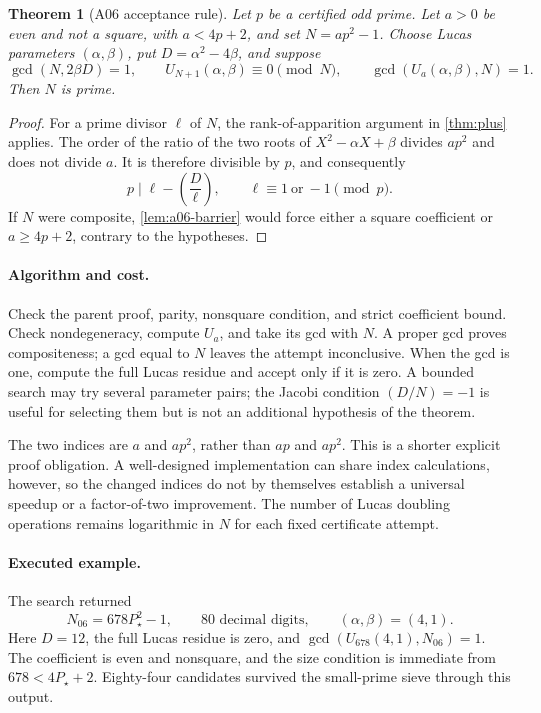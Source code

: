 \documentclass[11pt,a4paper]{article}
\newtheorem{theorem}{Theorem}[section]
\theoremstyle{definition}\newtheorem{definition}[theorem]{Definition}
\theoremstyle{remark}\newtheorem{remark}[theorem]{Remark}
\begin{document}
\begin{theorem}[A06 acceptance rule]\label{thm:a06}
Let $p$ be a certified odd prime. Let $a>0$ be even and not a square,
with $a<4p+2$, and set $N=ap^2-1$. Choose Lucas parameters
$(\alpha,\beta)$, put $D=\alpha^2-4\beta$, and suppose
\begin{equation}\label{eq:a06-tests}
 \gcd(N,2\beta D)=1,\qquad
 U_{N+1}(\alpha,\beta)\equiv0\pmod N,\qquad
 \gcd(U_a(\alpha,\beta),N)=1.
\end{equation}
Then $N$ is prime.
\end{theorem}
\begin{proof}
For a prime divisor $\ell$ of $N$, the rank-of-apparition argument in
\cref{thm:plus} applies. The order of the ratio of the two roots of
$X^2-\alpha X+\beta$ divides $ap^2$ and does not divide $a$.
It is therefore divisible by $p$, and consequently
\[
 p\mid\ell-\left(\frac D\ell\right),
 \qquad \ell\equiv1\ \text{or}\ -1\pmod p.
\]
If $N$ were composite, \cref{lem:a06-barrier} would force either a square
coefficient or $a\ge4p+2$, contrary to the hypotheses.
\end{proof}

\paragraph{Algorithm and cost.}
Check the parent proof, parity, nonsquare condition, and strict coefficient
bound. Check nondegeneracy, compute $U_a$, and take its gcd with $N$.
A proper gcd proves compositeness; a gcd equal to $N$ leaves the attempt
inconclusive. When the gcd is one, compute the full Lucas residue and accept
only if it is zero. A bounded search may try several parameter pairs;
the Jacobi condition $(D/N)=-1$ is useful for selecting them but is not an
additional hypothesis of the theorem.

The two indices are $a$ and $ap^2$, rather than $ap$ and $ap^2$.
This is a shorter explicit proof obligation. A well-designed implementation
can share index calculations, however, so the changed indices do not by
themselves establish a universal speedup or a factor-of-two improvement.
The number of Lucas doubling operations remains logarithmic in $N$ for
each fixed certificate attempt.

\paragraph{Executed example.}
The search returned
\begin{equation}\label{eq:a06-example}
 N_{06}=678P_\star^2-1,
 \qquad\text{80 decimal digits},
 \qquad(\alpha,\beta)=(4,1).
\end{equation}
Here $D=12$, the full Lucas residue is zero, and
$\gcd(U_{678}(4,1),N_{06})=1$. The coefficient is even and nonsquare,
and the size condition is immediate from $678<4P_\star+2$.
Eighty-four candidates survived the small-prime sieve through this output.
\end{document}
